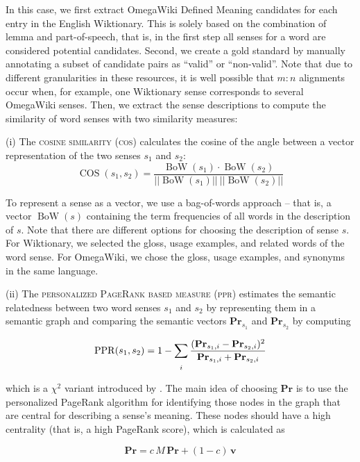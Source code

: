 \documentclass[output=paper]{LSP/langsci}
\begin{document}
In this case, we first extract OmegaWiki Defined Meaning candidates for each entry in the English Wiktionary. This is solely based on the combination of lemma and part-of-speech, that is, in the first step all senses for a word are considered potential candidates. Second, we create a gold standard by manually annotating a subset of candidate pairs as ``valid'' or ``non-valid''. Note that due to different granularities in these resources, it is well possible that $m:n$ alignments occur when, for example, one Wiktionary sense corresponds to several OmegaWiki senses. Then, we extract the sense descriptions to compute the similarity of word senses with two similarity measures: 

 (i) The \textsc{cosine similarity} (\textsc{cos}) calculates the cosine of the angle between a vector representation of the two senses $s_1$ and $s_2$:
 $$\operatorname{COS}(s_1, s_2) = \frac{\operatorname{BoW}(s_1) \cdot \operatorname{BoW}(s_2)}{||\operatorname{BoW}(s_1)|| \: ||\operatorname{BoW}(s_2)||}$$

 To represent a sense as a vector, we use a bag-of-words approach -- that is, a vector $\operatorname{BoW}(s)$ containing the term frequencies of all words in the description of $s$. 
Note that there are different options for choosing the description of sense $s$. 
For Wiktionary, we selected the gloss, usage examples, and related words of the word sense. For OmegaWiki, we chose the gloss, usage examples, and synonyms in the same language.
 
 (ii) The \textsc{personalized PageRank based measure  (ppr)} \citep{Agirre2009} estimates the semantic relatedness between two word senses $s_1$ and $s_2$ by representing them in a semantic graph and comparing the semantic vectors $\mathbf{Pr}_{s_1}$ and $\mathbf{Pr}_{s_2}$ by computing
 
 $$\operatorname{PPR}(s_1, s_2) = 1 - \sum_{\raisebox{-1.3ex}{\scriptsize $i$}} \frac{(\mathbf{Pr}_{s_1,i} - \mathbf{Pr}_{s_2,i})^2}{\mathbf{Pr}_{s_1,i} + \mathbf{Pr}_{s_2,i}}$$
 
 which is a $\chi^2$ variant introduced by \citet{Niemann2011}.
 The main idea of choosing $\mathbf{Pr}$ is to use the personalized PageRank algorithm for identifying those nodes in the graph that are central for describing a sense's meaning. 
 These nodes should have a high centrality (that is, a high PageRank score), which is calculated as 

 $$\mathbf{Pr} = c \, M \, \mathbf{Pr} + (1 - c) \, \mathbf{v}$$
\end{document}
